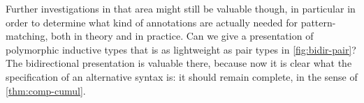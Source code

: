 Further investigations in that area might still be valuable though, in particular in order
to determine what kind of annotations are actually needed for pattern-matching, both
in theory and in practice. Can we give a presentation of polymorphic inductive types
that is as lightweight as pair types in \cref{fig:bidir-pair}?
The bidirectional presentation is valuable there, because now
it is clear what the specification of an alternative syntax is:
it should remain complete, in the sense of \cref{thm:comp-cumul}.